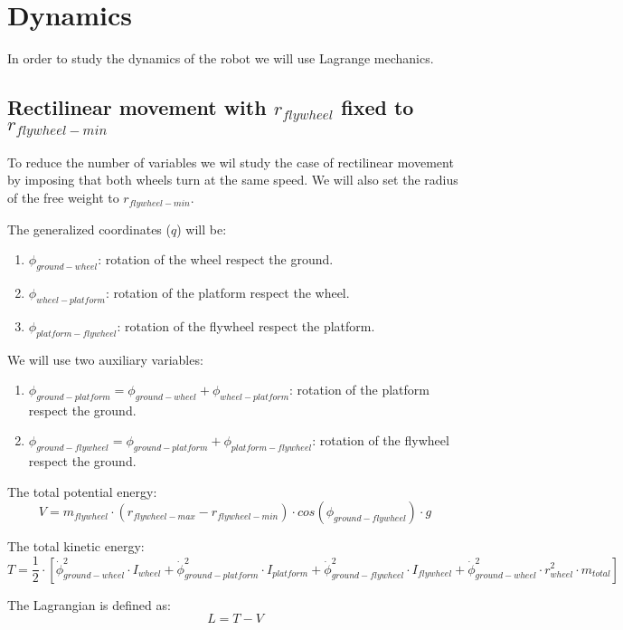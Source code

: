 \section{Dynamics}

In order to study the dynamics of the robot we will use Lagrange mechanics.

\subsection{Rectilinear movement with $r_{flywheel}$ fixed to $r_{flywheel-min}$}
To reduce the number of variables we wil study the case of rectilinear
movement by imposing that both wheels turn at the same speed. We will also set
the radius of the free weight to $r_{flywheel-min}$.

The generalized coordinates ($q$) will be:
\begin{enumerate}
	\item $\phi_{ground-wheel}$: rotation of the wheel respect the ground.
	\item $\phi_{wheel-platform}$: rotation of the platform respect the wheel.
	\item $\phi_{platform-flywheel}$: rotation of the flywheel respect the platform.
\end{enumerate}

We will use two auxiliary variables:
\begin{enumerate}
	\item $\phi_{ground-platform}=\phi_{ground-wheel}+\phi_{wheel-platform}$: rotation of the platform respect the ground.
	\item $\phi_{ground-flywheel}=\phi_{ground-platform}+\phi_{platform-flywheel}$: rotation of the flywheel respect the ground.
\end{enumerate}

The total potential energy:
\begin{equation}
	V = m_{flywheel}\cdot (r_{flywheel-max}-r_{flywheel-min}) \cdot cos(\phi_{ground-flywheel}) \cdot g	
\end{equation}


The total kinetic energy:
\begin{equation}
	T = \frac{1}{2}\cdot[\dot{\phi}_{ground-wheel}^2\cdot I_{wheel}
	+ \dot{\phi}_{ground-platform}^2 \cdot I_{platform}
	+ \dot{\phi}_{ground-flywheel}^2\cdot I_{flywheel}
	+ \dot{\phi}_{ground-wheel}^2\cdot r_{wheel}^2\cdot m_{total}]	
\end{equation}

The Lagrangian is defined as:
\begin{equation}
	L=T-V	
\end{equation}

